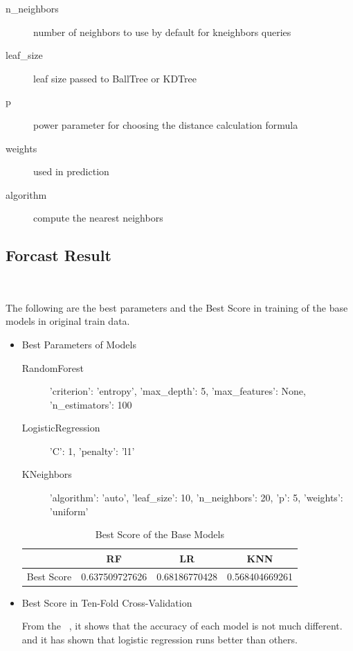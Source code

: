 \begin{description}
	\item[n_neighbors] number of neighbors to use 
	by default for kneighbors queries
	\item[leaf_size] leaf size passed to BallTree or KDTree
	\item[p] power parameter for choosing 
	the distance calculation formula
	\item[weights] used in prediction
	\item[algorithm] compute the nearest neighbors
\end{description}

	

\subsection{Forcast Result}

\

The following are the best parameters and 
the Best Score in training of 
the base models 
in original train data. 

\begin{itemize}
	\item Best Parameters of Models
	\begin{description}
		\item[RandomForest] 'criterion': 'entropy', 'max_depth': 5, 
		'max_features': None, 'n_estimators': 100
		\item[LogisticRegression] 'C': 1, 'penalty': 'l1'

		\item[KNeighbors] 'algorithm': 'auto', 'leaf_size': 10, 
		'n_neighbors': 20, 'p': 5, 'weights': 'uniform'

	\end{description}

	
	
	\begin{table}[h]  \centering
		\caption{Best Score of the Base Models}
		\label{tbl:best_score_base_models_old}
		\begin{tabular}{cccc}
			\toprule
			& RF  & LR  & KNN \\
			\midrule
			Best Score & 0.637509727626  & 0.68186770428  & 0.568404669261\\
			\bottomrule
		\end{tabular}
	\end{table}
	\item Best Score in Ten-Fold Cross-Validation

From the  ~,
it shows that the accuracy of 
each model is not much different.
and  it has shown that logistic regression runs better than others.
\end{itemize}





